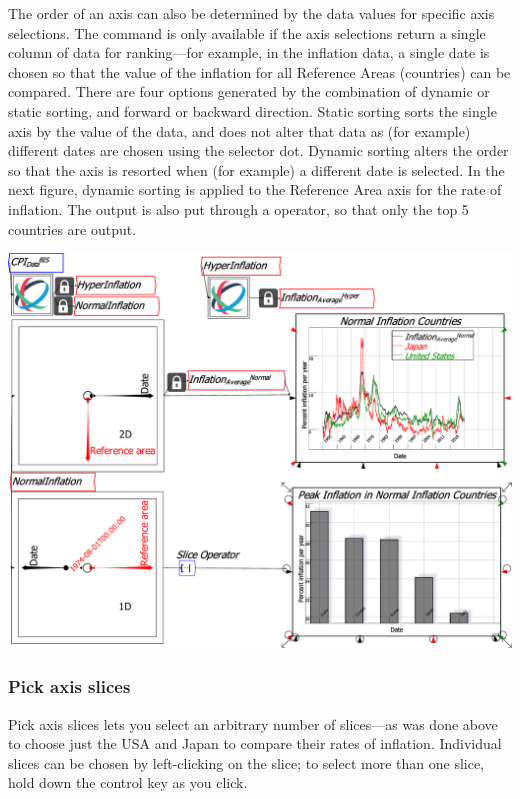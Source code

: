 The order of an axis can also be determined by the data values for
specific axis selections. The command is only available if the axis
selections return a single column of data for ranking---for example,
in the inflation data, a single date is chosen so that the value of
the inflation for all Reference Areas (countries) can be compared.
There are four options generated by the combination of dynamic or
static sorting, and forward or backward direction. Static sorting
sorts the single axis by the value of the data, and does not alter
that data as (for example) different dates are chosen using the selector
dot. Dynamic sorting alters the order so that the axis is resorted
when (for example) a different date is selected. In the next figure,
dynamic sorting is applied to the Reference Area axis for the rate
of inflation. The output is also put through a 
operator, so that only the top 5 countries are output.

\noindent\includegraphics[width=\textwidth]{images/CPI_SubsetsDynamicSorting}

\subsubsection{Pick axis slices}

Pick axis slices lets you select an arbitrary number of slices---as
was done above to choose just the USA and Japan to compare their rates
of inflation. Individual slices can be chosen by left-clicking on
the slice; to select more than one slice, hold down the control key
as you click.

